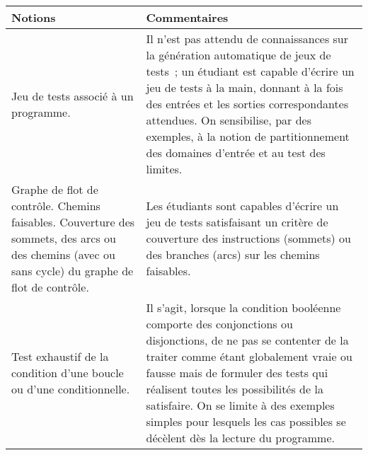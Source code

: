 \begin{longtable}{|p{\lnotion}|p{\comment}|}
    \hline
    \textbf{Notions} & \textbf{Commentaires} \\
    \hline \hline
    Jeu de tests associé à un programme.
    &
    Il n'est pas attendu de connaissances sur la génération automatique de jeux de tests~; un étudiant est capable d'écrire un jeu de tests à la main, donnant à la fois des entrées et les sorties correspondantes attendues. On sensibilise, par des exemples, à la notion de partitionnement des domaines d'entrée et au test des limites.
    \\
    \hline
    Graphe de flot de contrôle. Chemins faisables. Couverture des sommets, des arcs ou des chemins (avec ou sans cycle) du graphe de flot de contrôle.
    &
    Les étudiants sont capables d'écrire un jeu de tests satisfaisant un critère de couverture des instructions (sommets) ou des branches (arcs) sur les chemins faisables.
    \\
    \hline
    Test exhaustif de la condition d'une boucle ou d'une conditionnelle.
    &
    Il s'agit, lorsque la condition booléenne comporte des conjonctions ou
    disjonctions, de ne pas se contenter de la traiter comme étant
    globalement vraie ou fausse mais de formuler des tests qui réalisent
    toutes les possibilités de la satisfaire. On se limite à des exemples
    simples pour lesquels les cas possibles se décèlent dès la lecture du
    programme.
    \\
    
    
    
    \hline
\end{longtable}
